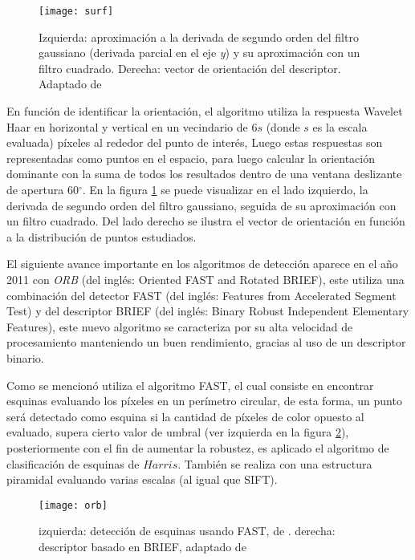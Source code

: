 \begin{figure}[H]
	\centering
	\texttt{[image: surf]}
	\caption[Detector y descriptor SURF]{Izquierda: aproximación a la derivada de segundo orden del filtro gaussiano (derivada parcial en el eje \textit{y}) y su aproximación con un filtro cuadrado. Derecha: vector de orientación del descriptor. Adaptado de \cite{surf}}
	\label{imagen:surf}
\end{figure}

En función de identificar la orientación, el algoritmo utiliza la respuesta Wavelet Haar en horizontal y vertical en un vecindario de 6$s$ (donde $s$ es la escala evaluada) píxeles al rededor del punto de interés, Luego estas respuestas son representadas como puntos en el espacio, para luego calcular la orientación dominante con la suma de todos los resultados dentro de una ventana deslizante de apertura 60$^\circ$. En la figura \ref{imagen:surf} se puede visualizar en el lado izquierdo, la derivada de segundo orden del filtro gaussiano, seguida de su aproximación con un filtro cuadrado. Del lado derecho se ilustra el vector de orientación en función a la distribución de puntos estudiados.

El siguiente avance importante en los algoritmos de detección aparece en el año 2011 con \textit{ORB} \cite{orb} (del inglés: Oriented FAST and Rotated BRIEF), este utiliza una combinación del detector FAST (del inglés: Features from Accelerated Segment Test) y del descriptor BRIEF (del inglés: Binary Robust Independent Elementary Features), este nuevo algoritmo se caracteriza por su alta velocidad de procesamiento manteniendo un buen rendimiento, gracias al uso de un descriptor binario. 

Como se mencionó utiliza el algoritmo FAST, el cual consiste en encontrar esquinas evaluando los píxeles en un perímetro circular, de esta forma, un punto será detectado como esquina si la cantidad de píxeles de color opuesto al evaluado, supera cierto valor de umbral (ver izquierda en la figura \ref{imagen:orb}), posteriormente con el fin de aumentar la robustez, es aplicado el algoritmo de clasificación de esquinas de $Harris$. También se realiza con una estructura piramidal evaluando varias escalas (al igual que SIFT).

\begin{figure}[H]
	\centering
	\texttt{[image: orb]}
	\caption[Detector y descriptor ORB]{izquierda: detección de esquinas usando FAST, de \cite{fast}. derecha: descriptor basado en BRIEF, adaptado de\protect\footnotemark }
	\label{imagen:orb}
\end{figure}

